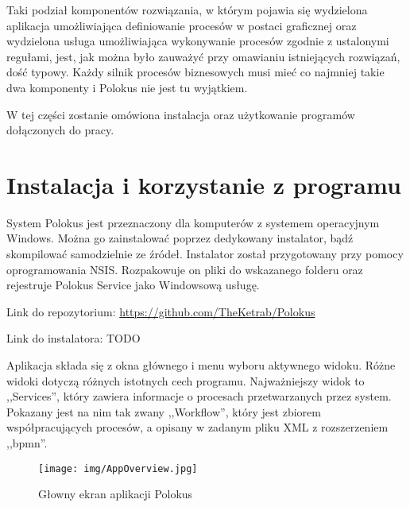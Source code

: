 \documentclass[declaration,shortabstract,mgr]{iithesis}
\begin{document}
Taki podział komponentów rozwiązania, w którym pojawia się
wydzielona aplikacja umożliwiająca definiowanie procesów w postaci graficznej oraz wydzielona usługa umożliwiająca wykonywanie procesów
zgodnie z ustalonymi regułami, jest, jak można było zauważyć przy
omawianiu istniejących rozwiązań, dość typowy. Każdy silnik
procesów biznesowych musi mieć co najmniej takie dwa komponenty
i Polokus nie jest tu wyjątkiem.

W tej części zostanie omówiona instalacja oraz użytkowanie programów dołączonych do pracy.

\section{Instalacja i korzystanie z programu}

System Polokus jest przeznaczony dla komputerów z systemem operacyjnym Windows. Można go zainstalować poprzez dedykowany instalator, bądź skompilować samodzielnie ze źródeł. Instalator został przygotowany przy pomocy oprogramowania NSIS. Rozpakowuje on pliki do wskazanego folderu oraz rejestruje Polokus Service jako Windowsową usługę.

\noindent Link do repozytorium: \href{https://github.com/TheKetrab/Polokus}{https://github.com/TheKetrab/Polokus}

\noindent Link do instalatora: TODO



Aplikacja składa się z okna głównego i menu wyboru aktywnego widoku. Różne widoki dotyczą różnych istotnych cech programu. Najważniejszy widok to ,,Services'', który zawiera informacje o procesach przetwarzanych przez system. Pokazany jest na nim tak zwany ,,Workflow'', który jest zbiorem współpracujących procesów, a opisany w zadanym pliku XML z rozszerzeniem ,,bpmn''.

\begin{figure}[H]
    \texttt{[image: img/AppOverview.jpg]}
    \caption{Głowny ekran aplikacji Polokus}
    \label{fig:polokus-app}
\end{figure}
\end{document}
